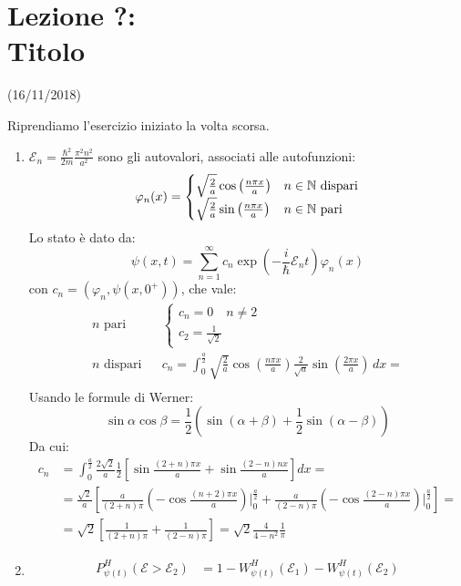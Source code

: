 \documentclass[../../FisicaTeorica.tex]{subfiles}
\begin{document}
\section{Lezione ?:\\ \large{Titolo}}
\vspace{-1em}
\begin{center}
    \small{(16/11/2018)}
\end{center}
Riprendiamo l'esercizio iniziato la volta scorsa.
\begin{enumerate}
\item $\mathcal{E}_n = \frac{\hbar^2}{2m} \frac{\pi^2 n^2}{a^2}$ sono gli autovalori, associati alle autofunzioni:
\[
\varphi_n(x)=\begin{cases}
\sqrt{\frac{2}{a}}\cos\left(\frac{n\pi x}{a}\right) & n\in \mathbb{N} \text{ dispari}\\
\sqrt{\frac{2}{a}}\sin\left(\frac{n\pi x}{a}\right) & n\in \mathbb{N} \text{ pari}
\end{cases}
\]
Lo stato è dato da:
\[
\psi(x,t)=\sum_{n=1}^\infty c_n \exp\left(-\frac{i}{\hbar}\mathcal{E}_n t\right) \varphi_n(x)
\]
con $c_n=(\varphi_n, \psi(x,0^+))$, che vale:
\begin{align*}
\text{$n$ pari} && \begin{cases}
c_n = 0 \quad n \neq 2\\
c_2 = \frac{1}{\sqrt{2}}
\end{cases}\\
\text{$n$ dispari} && c_n=\int_0^\frac{a}{2} \sqrt{\frac{2}{a}}\cos\left(\frac{n\pi x}{a}\right)\frac{2}{\sqrt{a}}\sin\left(\frac{2\pi x}{a}\right)\,dx=\\
\end{align*}
Usando le formule di Werner:
\[
\sin\alpha \cos \beta = \frac{1}{2}(\sin(\alpha+\beta)+\frac{1}{2}\sin(\alpha-\beta))
\]
Da cui:
\begin{align*}
c_n &= \int_0^{\frac{a}{2}}\frac{2\sqrt{2}}{a}\frac{1}{2}\left[\sin\frac{(2+n)\pi x}{a}+\sin\frac{(2-n)n x}{a}\right]dx =\\
&= \frac{\sqrt{2}}{a}\left[ \frac{a}{(2+n)\pi}\left(-\cos \frac{(n+2)\pi x}{a}\right)\Big|_{0}^{\frac{a}{2}}+\frac{a}{(2-n)\pi}\left(-\cos\frac{(2-n)\pi x}{a}\right)\Big|_{0}^{\frac{a}{2}} \right] =\\
&=\sqrt{2}\left[\frac{1}{(2+n)\pi} + \frac{1}{(2-n)\pi}\right]=\sqrt{2}\frac{4}{4-n^2}\frac{1}{\pi}
\end{align*}
\item \begin{align*}
P^H_{\psi(t)}(\mathcal{E}>\mathcal{E}_2)&=1-W^H_{\psi(t)}(\mathcal{E}_1)-W^H_{\psi(t)}(\mathcal{E}_2)\\

\end{align*}
\end{enumerate}
\end{document}
